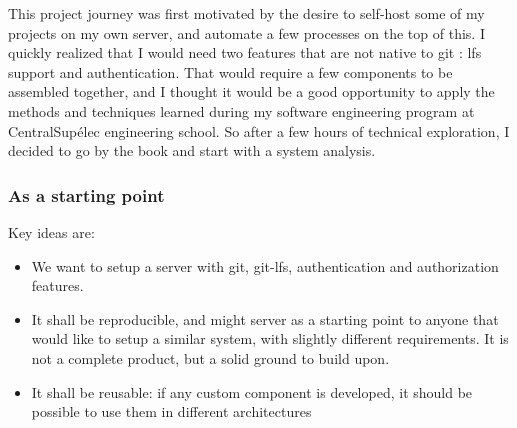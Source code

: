 This project journey was first motivated by the desire to self-host some of my projects on my own server, and automate a few processes on the top of this. I quickly realized that I would need two features that are not native to git : lfs support and authentication. That would require a few components to be assembled together, and I thought it would be a good opportunity to apply the methods and techniques learned during my software engineering program at CentralSupélec engineering school. So after a few hours of technical exploration, I decided to go by the book and start with a system analysis.

\subsubsection{As a starting point}

Key ideas are: 

\begin{itemize}
    \item We want to setup a server with git, git-lfs, authentication and authorization features. 
    \item It shall be reproducible, and might server as a starting point to anyone that would like to setup a similar system, with slightly different requirements. It is not a complete product, but a solid ground to build upon.
    \item It shall be reusable: if any custom component is developed, it should be possible to use them in different architectures
\end{itemize}
